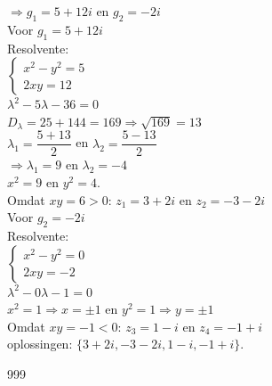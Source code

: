 \documentclass[a4paper]{article}
\begin{document}
$\Rightarrow g_1 = 5 + 12i$ en $g_2 = -2i$\\



Voor $g_1 = 5 + 12i$\\

Resolvente:\\

$\left\{ \begin{array}{l} 
	x^2 - y^2 = 5\\ 
	2xy = 12 
\end{array} \right. $\\


$\lambda^2 - 5\lambda - 36 = 0$\\

$D_{\lambda} = 25 + 144 = 169 \Rightarrow \sqrt{169} = 13$\\

$\lambda_{1} = \dfrac{5 + 13}{2}$ en $\lambda_{2} = \dfrac{5 - 13}{2}$\\

$\Rightarrow \lambda_1 = 9$ en  $\lambda_2 = -4$\\

$x^2 = 9$ en $y^2 = 4$.\\

Omdat $xy = 6 > 0$: ${z_1 = 3 + 2i}$ en ${z_2 = -3 - 2i}$\\


Voor $g_2 = -2i$\\

Resolvente:\\

$\left\{ \begin{array}{l} 
	x^2 - y^2 = 0\\
	2xy = -2
\end{array} \right. $\\

$\lambda^2 - 0\lambda - 1 = 0$ \\

$x^2 = 1 \Rightarrow x = \pm 1$ en $y^2 = 1 \Rightarrow y = \pm 1$\\

Omdat $xy = -1 < 0$: $z_3 = 1 - i$ en $z_4 = -1 + i$\\


oplossingen: $\{3 + 2i, -3 - 2i, 1 - i, -1 + i\}$.

\begin{thebibliography}{999}
\end{thebibliography}
\end{document}
